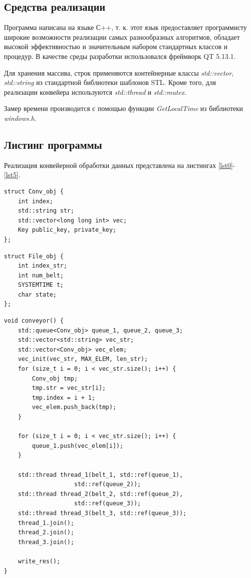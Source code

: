 \documentclass[a4paper,12pt]{article}
\begin{document}
\subsection{Средства реализации}

Программа написана на языке С++, т. к. этот язык предоставляет программисту широкие возможности реализации самых разнообразных алгоритмов, обладает высокой эффективностью и значительным набором стандартных классов и процедур. В качестве среды разработки использовался  фреймворк QT 5.13.1.
	
Для хранения массива, строк применяются 
контейнерные классы \textit{std::vector}, \textit{std::string} из стандартной 
библиотеки шаблонов STL. Кроме того, для реализации конвейера
используются \textit{std::thread} и \textit{std::mutex}.
	
Замер времени
производится с помощью функции \textit{GetLocalTime} из библиотеки \textit{windows.h}.
    
\subsection{Листинг программы}

Реализация конвейерной обработки данных представлена на листингах \ref{lst0}-\ref{lst5}.

\begin{lstlisting}[label=lst0, caption={Структура объекта конвейера}]
struct Conv_obj {
    int index;
    std::string str;
    std::vector<long long int> vec;
    Key public_key, private_key;
};
\end{lstlisting}

\begin{lstlisting}[label=lst1,caption=Структура объекта для записи в файл логов]
struct File_obj {
    int index_str;
    int num_belt;
    SYSTEMTIME t;
    char state;
};
\end{lstlisting}
 
\begin{lstlisting}[label=lst2,caption=Главная функция конвейера]
void conveyor() {
    std::queue<Conv_obj> queue_1, queue_2, queue_3;
    std::vector<std::string> vec_str;
    std::vector<Conv_obj> vec_elem;
    vec_init(vec_str, MAX_ELEM, len_str);
    for (size_t i = 0; i < vec_str.size(); i++) {
        Conv_obj tmp;
        tmp.str = vec_str[i];
        tmp.index = i + 1;
        vec_elem.push_back(tmp);
    }

    for (size_t i = 0; i < vec_str.size(); i++) {
        queue_1.push(vec_elem[i]);
    }

    std::thread thread_1(belt_1, std::ref(queue_1), 
					std::ref(queue_2));
    std::thread thread_2(belt_2, std::ref(queue_2),
					std::ref(queue_3));
    std::thread thread_3(belt_3, std::ref(queue_3));
    thread_1.join();
    thread_2.join();
    thread_3.join();

    write_res();
}
\end{lstlisting}
\end{document}

